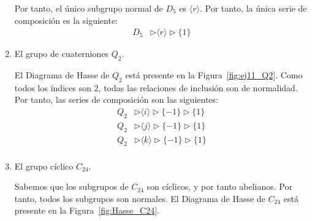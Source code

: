 \begin{ejercicio}
\begin{enumerate}
        Por tanto, el único subgrupo normal de $D_5$ es $\langle r\rangle$. Por tanto, la única serie de composición es la siguiente:
        \begin{align*}
            D_5 &\rhd \langle r \rangle \rhd \{1\}
        \end{align*}
        \item El grupo de cuaterniones $Q_2$.
        
        El Diagrama de Hasse de $Q_2$ está presente en la Figura~\ref{fig:ej11_Q2}. Como todos los índices son $2$, todas las relaciones de inclusión son de normalidad. Por tanto, las series de composición son las siguientes:
        \begin{align*}
            Q_2 &\rhd \langle i \rangle \rhd \{-1\} \rhd \{1\} \\
            Q_2 &\rhd \langle j \rangle \rhd \{-1\} \rhd \{1\} \\
            Q_2 &\rhd \langle k \rangle \rhd \{-1\} \rhd \{1\} \\
        \end{align*}
        \item El grupo cíclico $C_{24}$.
        
        Sabemos que los subgrupos de $C_{24}$ son cíclicos, y por tanto abelianos. Por tanto, todos los subgrupos son normales. El Diagrama de Hasse de $C_{24}$ está presente en la Figura~\ref{fig:Hasse_C24}.
        \begin{figure}
            \centering
\end{figure}
\end{enumerate}
\end{ejercicio}
